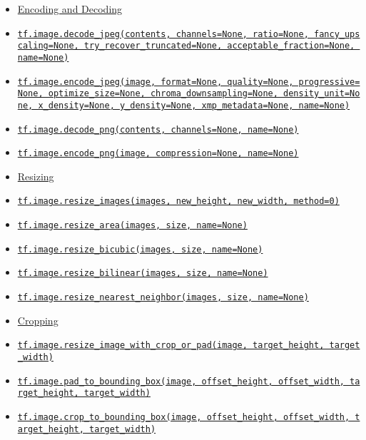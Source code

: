 \begin{itemize}
\tightlist
\item
  \protect\hyperlink{AUTOGENERATED-encoding-and-decoding}{Encoding and
  Decoding}
\item
  \protect\hyperlink{decodeux5fjpeg}{\texttt{tf.image.decode\_jpeg(contents,\ channels=None,\ ratio=None,\ fancy\_upscaling=None,\ try\_recover\_truncated=None,\ acceptable\_fraction=None,\ name=None)}}
\item
  \protect\hyperlink{encodeux5fjpeg}{\texttt{tf.image.encode\_jpeg(image,\ format=None,\ quality=None,\ progressive=None,\ optimize\_size=None,\ chroma\_downsampling=None,\ density\_unit=None,\ x\_density=None,\ y\_density=None,\ xmp\_metadata=None,\ name=None)}}
\item
  \protect\hyperlink{decodeux5fpng}{\texttt{tf.image.decode\_png(contents,\ channels=None,\ name=None)}}
\item
  \protect\hyperlink{encodeux5fpng}{\texttt{tf.image.encode\_png(image,\ compression=None,\ name=None)}}
\item
  \protect\hyperlink{AUTOGENERATED-resizing}{Resizing}
\item
  \protect\hyperlink{resizeux5fimages}{\texttt{tf.image.resize\_images(images,\ new\_height,\ new\_width,\ method=0)}}
\item
  \protect\hyperlink{resizeux5farea}{\texttt{tf.image.resize\_area(images,\ size,\ name=None)}}
\item
  \protect\hyperlink{resizeux5fbicubic}{\texttt{tf.image.resize\_bicubic(images,\ size,\ name=None)}}
\item
  \protect\hyperlink{resizeux5fbilinear}{\texttt{tf.image.resize\_bilinear(images,\ size,\ name=None)}}
\item
  \protect\hyperlink{resizeux5fnearestux5fneighbor}{\texttt{tf.image.resize\_nearest\_neighbor(images,\ size,\ name=None)}}
\item
  \protect\hyperlink{AUTOGENERATED-cropping}{Cropping}
\item
  \protect\hyperlink{resizeux5fimageux5fwithux5fcropux5forux5fpad}{\texttt{tf.image.resize\_image\_with\_crop\_or\_pad(image,\ target\_height,\ target\_width)}}
\item
  \protect\hyperlink{padux5ftoux5fboundingux5fbox}{\texttt{tf.image.pad\_to\_bounding\_box(image,\ offset\_height,\ offset\_width,\ target\_height,\ target\_width)}}
\item
  \protect\hyperlink{cropux5ftoux5fboundingux5fbox}{\texttt{tf.image.crop\_to\_bounding\_box(image,\ offset\_height,\ offset\_width,\ target\_height,\ target\_width)}}

\end{itemize}

